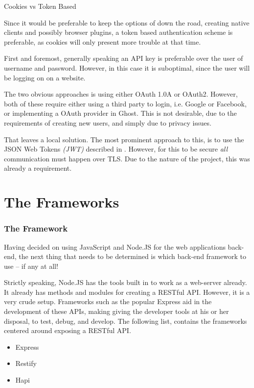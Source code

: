 		Cookies vs Token Based

		Since it would be preferable to keep the options of down the road, creating native clients and possibly browser plugins, a token based authentication scheme is preferable, as cookies will only present more trouble at that time.

		First and foremost, generally speaking an API key is preferable over the user of username and password. However, in this case it is suboptimal, since the user will be logging on on a website.

		The two obvious approaches is using either OAuth 1.0A or OAuth2. However, both of these require either using a third party to login, i.e. Google or Facebook, or implementing a OAuth provider in Ghost. This is not desirable, due to the requirements of creating new users, and simply due to privacy issues.

		That leaves a local solution. The most prominent approach to this, is to use the JSON Web Tokens \emph{(JWT)} described in \cite{JWT}. However, for this to be secure \emph{all} communication must happen over TLS. Due to the nature of the project, this was already a requirement.

		

	\section{The Frameworks}
			\subsubsection{The Framework}
			Having decided on using JavaScript and Node.JS for the web applications back-end, the next thing that needs to be determined is which back-end framework to use -- if any at all!

			Strictly speaking, Node.JS has the tools built in to work as a web-server already. It already has methods and modules for creating a RESTful API. However, it is a very crude setup. Frameworks such as the popular Express aid in the development of these APIs, making giving the developer tools at his or her disposal, to test, debug, and develop. The following list, contains the frameworks centered around exposing a RESTful API.

			\begin{itemize}
				\item Express
				\item Restify
				\item Hapi
			\end{itemize}

